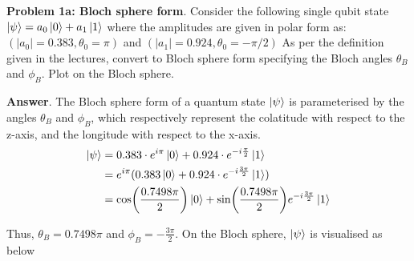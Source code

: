 \textbf{Problem 1a: Bloch sphere form}. Consider the following single qubit state $\ket{\psi} = a_0\ket{0} + a_1\ket{1}$ where the amplitudes are given in polar form as: $(|a_0| = 0.383, \theta_0 = \pi)$ and $(|a_1| = 0.924, \theta_0 = -\pi /2)$ 
As per the definition given in the lectures, convert to Bloch sphere form specifying the Bloch angles $\theta_B$ and $\phi_B$. Plot on the Bloch sphere.


\textbf{Answer}. The Bloch sphere form of a quantum state $\ket{\psi}$ is parameterised by the angles $\theta_B$ and $\phi_B$, which respectively represent the colatitude with respect to the z-axis, and the longitude with respect to the x-axis.
\begin{align*}
	\ket{\psi} &= 0.383 \cdot e^{i \pi} \ket{0} + 0.924 \cdot e^{-i \frac{\pi}{2}} \ket{1} \\
	&= e^{i \pi} (0.383 \ket{0} + 0.924 \cdot e^{-i \frac{3\pi}{2}} \ket{1}) \\
	&= \cos(\frac{0.7498 \pi}{2}) \ket{0} + \sin(\frac{0.7498 \pi}{2}) e^{-i \frac{3\pi}{2}} \ket{1}  
\end{align*}

Thus, $\theta_B = 0.7498\pi$ and $\phi_B = -\frac{3\pi}{2}$. On the Bloch sphere, $\ket{\psi}$ is visualised as below

